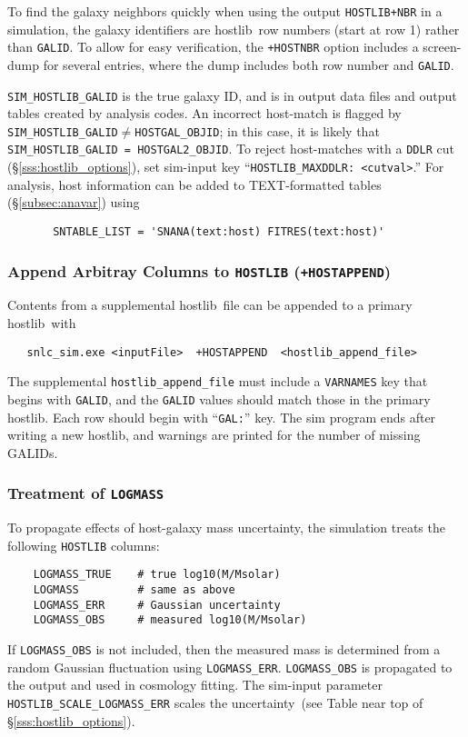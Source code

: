 \documentclass[12pt]{article}
\newcommand{\unc}{uncertainty}
\newcommand{\hostlib}{{\sc hostlib}}
\begin{document}
{To find the galaxy neighbors quickly when using the output 
{\tt HOSTLIB+NBR}
in a simulation,
the galaxy identifiers are \hostlib\ row numbers (start at row 1)
rather than {\tt GALID}.
To allow for easy verification, the {\tt +HOSTNBR} option includes a 
screen-dump for several entries,
where the dump includes both row number and {\tt GALID}.

{\tt SIM\_HOSTLIB\_GALID} is the true galaxy ID, and is in 
output data files and output tables created by analysis codes.
An incorrect host-match is flagged by
{\tt SIM\_HOSTLIB\_GALID}$\ne${\tt HOSTGAL\_OBJID};
in this case, it is likely that
{\tt SIM\_HOSTLIB\_GALID = HOSTGAL2\_OBJID}.
To reject host-matches with a {\tt DDLR} cut
(\S\ref{sss:hostlib_options}),
set sim-input key ``{\tt HOSTLIB\_MAXDDLR: <cutval>}.''  
For analysis, host information can be added to TEXT-formatted
tables (\S\ref{subsec:anavar}) using 
\begin{verbatim}
       SNTABLE_LIST = 'SNANA(text:host) FITRES(text:host)'
\end{verbatim}

\subsubsection{Append Arbitray Columns to {\tt HOSTLIB} ({\tt +HOSTAPPEND})}
\label{sss:hostlib_append}

Contents from a supplemental \hostlib\ file can be appended to a
primary \hostlib\ with
\begin{verbatim}
   snlc_sim.exe <inputFile>  +HOSTAPPEND  <hostlib_append_file>
\end{verbatim} 
The supplemental {\tt hostlib\_append\_file} must include a
{\tt VARNAMES} key that begins with {\tt GALID}, and the
{\tt GALID} values should match those in the primary \hostlib.
Each row should begin with ``{\tt GAL:}'' key. 
The sim program ends after writing a new \hostlib,
and warnings are printed for the number of missing GALIDs.

\subsubsection{Treatment of {\tt LOGMASS} }
\label{sss:hostlib_logmass}

To propagate effects of  host-galaxy mass \unc,
the simulation treats the following {\tt HOSTLIB} columns:
%
\begin{Verbatim}
    LOGMASS_TRUE    # true log10(M/Msolar)
    LOGMASS         # same as above
    LOGMASS_ERR     # Gaussian uncertainty
    LOGMASS_OBS     # measured log10(M/Msolar)
\end{Verbatim}
%
If {\tt LOGMASS\_OBS} is not included, then the measured
mass is determined from a random Gaussian fluctuation
using {\tt LOGMASS\_ERR}. {\tt LOGMASS\_OBS} is propagated
to the output and used in cosmology fitting.
The sim-input parameter {\tt HOSTLIB\_SCALE\_LOGMASS\_ERR} scales 
the \unc\
(see Table near top of \S\ref{sss:hostlib_options}).



}
\end{document}
